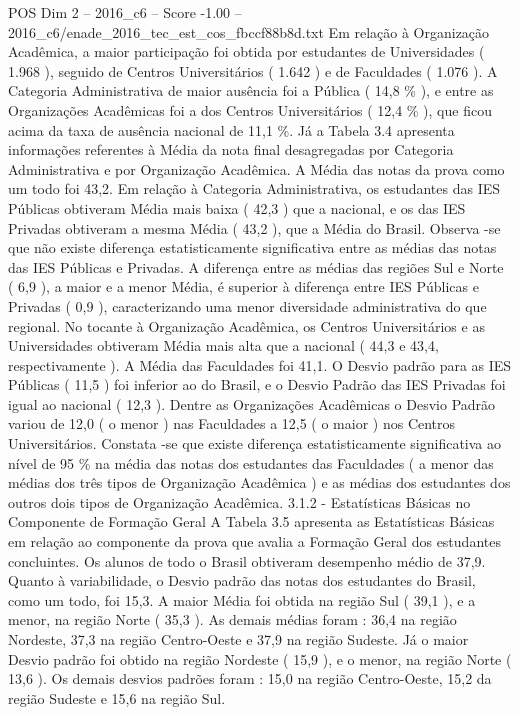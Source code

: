 \begin{textsample}{POS Dim 2 – 2016\_c6 – Score -1.00 – 2016\_c6/enade\_2016\_tec\_est\_cos\_fbccf88b8d.txt}
Em relação à Organização Acadêmica, a maior participação foi obtida por estudantes de Universidades ( 1.968 ), seguido de Centros Universitários ( 1.642 ) e de Faculdades ( 1.076 ).
A Categoria Administrativa de maior ausência foi a Pública ( 14,8 \% ), e entre as Organizações Acadêmicas foi a dos Centros Universitários ( 12,4 \% ), que ficou acima da taxa de ausência nacional de 11,1 \%.
Já a Tabela 3.4 apresenta informações referentes à Média da nota final desagregadas por Categoria Administrativa e por Organização Acadêmica.
A Média das notas da prova como um todo foi 43,2.
Em relação à Categoria Administrativa, os estudantes das IES Públicas obtiveram Média mais baixa ( 42,3 ) que a nacional, e os das IES Privadas obtiveram a mesma Média ( 43,2 ), que a Média do Brasil.
Observa -se que não existe diferença estatisticamente significativa entre as médias das notas das IES Públicas e Privadas.
A diferença entre as médias das regiões Sul e Norte ( 6,9 ), a maior e a menor Média, é superior à diferença entre IES Públicas e Privadas ( 0,9 ), caracterizando uma menor diversidade administrativa do que regional.
No tocante à Organização Acadêmica, os Centros Universitários e as Universidades obtiveram Média mais alta que a nacional ( 44,3 e 43,4, respectivamente ).
A Média das Faculdades foi 41,1.
O Desvio padrão para as IES Públicas ( 11,5 ) foi inferior ao do Brasil, e o Desvio Padrão das IES Privadas foi igual ao nacional ( 12,3 ).
Dentre as Organizações Acadêmicas o Desvio Padrão variou de 12,0 ( o menor ) nas Faculdades a 12,5 ( o maior ) nos Centros Universitários.
Constata -se que existe diferença estatisticamente significativa ao nível de 95 \% na média das notas dos estudantes das Faculdades ( a menor das médias dos três tipos de Organização Acadêmica ) e as médias dos estudantes dos outros dois tipos de Organização Acadêmica. 3.1.2 - Estatísticas Básicas no Componente de Formação Geral A Tabela 3.5 apresenta as Estatísticas Básicas em relação ao componente da prova que avalia a Formação Geral dos estudantes concluintes.
Os alunos de todo o Brasil obtiveram desempenho médio de 37,9.
Quanto à variabilidade, o Desvio padrão das notas dos estudantes do Brasil, como um todo, foi 15,3.
A maior Média foi obtida na região Sul ( 39,1 ), e a menor, na região Norte ( 35,3 ).
As demais médias foram : 36,4 na região Nordeste, 37,3 na região Centro-Oeste e 37,9 na região Sudeste.
Já o maior Desvio padrão foi obtido na região Nordeste ( 15,9 ), e o menor, na região Norte ( 13,6 ).
Os demais desvios padrões foram : 15,0 na região Centro-Oeste, 15,2 da região Sudeste e 15,6 na região Sul.

\end{textsample}
